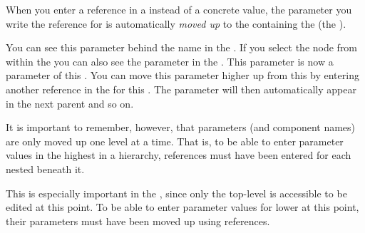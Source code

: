 
When you enter a reference in a \gdstep{} instead of a concrete value, the parameter you write the reference for is  automatically \emph{moved up} to the 
\gdcase{} containing the \gdstep{} (the ). 

You can see this parameter behind the \gdcase{} name in the \gdtestcaseeditor{}. If you select the \gdcase{} node from within the \gdtestcaseeditor{} you can also see the parameter in the \gdpropview{}. This parameter is now a parameter of this \gdcase{}. You can move this parameter higher up from this \gdcase{} by entering another reference in the \gdpropview{} for this \gdcase{}. The parameter will then automatically appear in the next parent \gdcase{} and so on. 

It is important to remember, however, that parameters (and component names) 
are only moved up one level at a time. That is, to be able to enter 
parameter values in the highest \gdcase{} in a hierarchy, references must 
have been entered for each nested \gdcase{} beneath it. 

This is especially important in the \gdtestsuiteeditor{}, since only 
the top-level \gdcase{} is accessible to be edited at this point. To be able 
to enter parameter values for lower \gdcases{} at this point, their parameters 
must have been moved up using references. 





